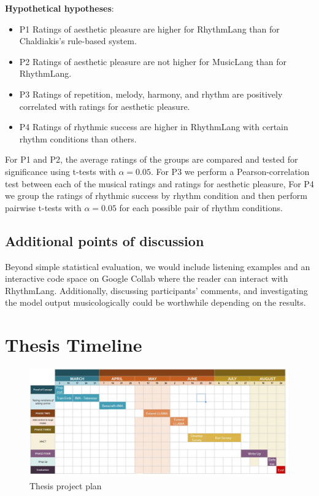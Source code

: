 \textbf{Hypothetical hypotheses}: 
\begin{itemize}
\item{P1} Ratings of aesthetic pleasure are higher for RhythmLang than for Chaldiakis's rule-based system. \\
\item{P2} Ratings of aesthetic pleasure are not higher for MusicLang than for RhythmLang. \\
\item{P3} Ratings of repetition, melody, harmony, and rhythm are positively correlated with ratings for aesthetic pleasure.\\
\item{P4} Ratings of rhythmic success are higher in RhythmLang with certain rhythm conditions than others. \\
\end{itemize}

For P1 and P2, the average ratings of the groups are compared and tested for significance using t-tests with $\alpha=0.05$. 
For P3 we perform a Pearson-correlation test between each of the musical ratings and ratings for aesthetic pleasure,
For P4 we group the ratings of rhythmic success by rhythm condition and then perform pairwise t-tests with $\alpha=0.05$ for each possible pair of rhythm conditions. 


\subsection{Additional points of discussion}
Beyond simple statistical evaluation, we would include listening examples and an interactive code space on Google Collab where the reader can interact with RhythmLang. Additionally, discussing participants' comments, and investigating the model output musicologically could be worthwhile depending on the results. 
\section{Thesis Timeline}

\begin{figure}[H]
    \centering
    \includegraphics[width=1\textwidth]{IMAGES/project_plan.jpg} 
    \caption{Thesis project plan}
    \label{fig:projectplan}
\end{figure}


